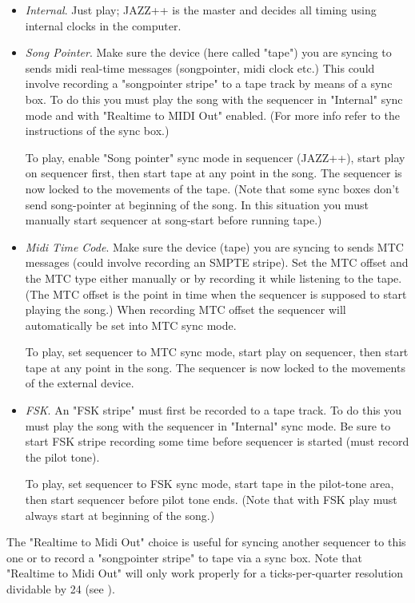 \documentclass[letterpaper]{report}
\begin{document}
\begin{itemize}

\item {\em Internal}.
Just play; JAZZ++ is the master and decides all timing
using internal clocks in the computer.

\item {\em Song Pointer}.
Make sure the device (here called "tape") you are syncing
to sends midi real-time messages (songpointer, midi clock etc.) This could
involve recording a "songpointer stripe" to a tape track by means of
a sync box. To do this you must play the song with the sequencer in
"Internal" sync mode and with "Realtime to MIDI Out" enabled. (For more info
refer to the instructions of the sync box.)

To play, enable "Song pointer" sync mode in sequencer (JAZZ++), start play on
sequencer
first, then start tape at any point in the song. The sequencer is now locked
to the movements of the tape. (Note that some sync boxes don't send
song-pointer at beginning of the song. In this situation you must manually
start sequencer at song-start before running tape.)

\item {\em Midi Time Code}.
Make sure the device (tape) you are syncing to sends
MTC messages (could involve recording an SMPTE stripe). Set the MTC offset
and the MTC type either manually or by recording it while listening to the
tape. (The MTC offset is the point in time when the sequencer is supposed
to start playing the song.) When recording MTC offset the sequencer will
automatically be set into MTC sync mode.

To play, set sequencer to MTC sync mode, start play on sequencer, then start
tape at any point in the song. The sequencer is now locked to the movements
of the external device.

\item {\em FSK}.
An "FSK stripe" must first be recorded to a tape track. To do
this you must play the song with the sequencer in "Internal" sync mode. Be
sure to start FSK stripe recording some time before sequencer is started
(must record the pilot tone).

To play, set sequencer to FSK sync mode, start tape in the pilot-tone area,
then start sequencer before pilot tone ends. (Note that with FSK play must
always start at beginning of the song.)

\end{itemize}

The "Realtime to Midi Out" choice is useful for syncing another sequencer
to this one or to record a "songpointer stripe" to tape via a sync box.
Note that "Realtime to Midi Out" will only work properly for a
ticks-per-quarter resolution dividable by 24
(see ).
\end{document}
